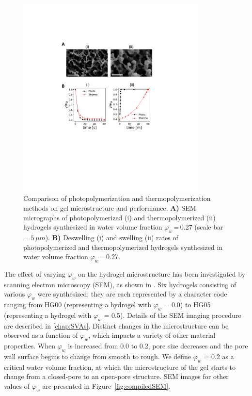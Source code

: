 \begin{figure}[!ht]
\centering
\includegraphics[width=0.85\textwidth]{photothermo.pdf}
\caption[]{Comparison of photopolymerization and thermopolymerization methods on gel microstructure and performance.
\textbf{A)} SEM micrographs of photopolymerized (i) and thermopolymerized (ii) hydrogels synthesized in water volume fraction \(\varphi_{w}\)\,=\,0.27 (scale bar = $5\,\mu m$). \textbf{B)} Deswelling (i) and swelling (ii) rates of photopolymerized and thermopolymerized hydrogels synthesized in water volume fraction \(\varphi_{w}\)\,=\,0.27.}
\label{fig:photothermo}
\end{figure}

The effect of varying \(\varphi_{w}\) on the hydrogel microstructure has been investigated by scanning electron microscopy (SEM), as shown in . Six hydrogels consisting of various \(\varphi_{w}\) were synthesized; they are each represented by a character code ranging from HG00 (representing a hydrogel with \(\varphi_{w}\) = 0.0) to HG05 (representing a hydrogel with \(\varphi_{w}\) = 0.5). Details of the SEM imaging procedure are described in \ref{chap:SVAs}. Distinct changes in the microstructure can be observed as a function of \(\varphi_{w}\), which impacts a variety of other material properties. When \(\varphi_{w}\) is increased from 0.0 to 0.2, pore size decreases and the pore wall surface begins to change from smooth to rough. We define \(\varphi_{w}\) = 0.2 as a critical water volume fraction, at which the microstructure of the gel starts to change from a closed-pore to an open-pore structure. SEM images for other values of \(\varphi_{w}\) are presented in Figure~\ref{fig:compiledSEM}.

